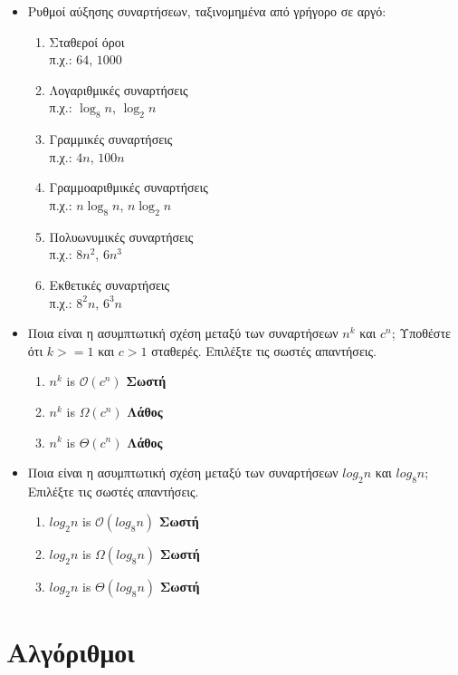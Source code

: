 \documentclass[a4paper,12pt]{article}
\begin{document}
\begin{itemize}
    \item Ρυθμοί αύξησης συναρτήσεων, ταξινομημένα από γρήγορο σε αργό:
    \begin{enumerate}
        \item Σταθεροί όροι \\
        π.χ.:    $64$, $1000$
        \item Λογαριθμικές συναρτήσεις \\
        π.χ.:    $\log_8n$, $\log_2n$
        \item Γραμμικές συναρτήσεις \\
        π.χ.:    $4n$, $100n$
        \item Γραμμοαριθμικές συναρτήσεις \\
        π.χ.:    $n\log_8n$, $n\log_2n$
        \item Πολυωνυμικές συναρτήσεις \\
        π.χ.:    $8n^2$, $6n^3$
        \item Εκθετικές συναρτήσεις \\
        π.χ.:    $8^2n$, $6^3n$
    \end{enumerate}
    \item Ποια είναι η ασυμπτωτική σχέση μεταξύ των συναρτήσεων $n^k$ και $c^n$; Υποθέστε
    ότι $k >= 1$ και $c > 1$ σταθερές. Επιλέξτε τις σωστές απαντήσεις.
    \begin{enumerate}
        \item $n^k$ is $\mathcal{O}(c^n)$ \textbf{Σωστή}
        \item $n^k$ is $\Omega(c^n)$ \textbf{Λάθος}
        \item $n^k$ is $\Theta(c^n)$ \textbf{Λάθος}
    \end{enumerate}        
    \item Ποια είναι η ασυμπτωτική σχέση μεταξύ των συναρτήσεων $log_2n$ και $log_8n$; 
    Επιλέξτε τις σωστές απαντήσεις.
    \begin{enumerate}
        \item $log_2n$ is $\mathcal{O}(log_8n)$ \textbf{Σωστή}
        \item $log_2n$ is $\Omega(log_8n)$ \textbf{Σωστή}
        \item $log_2n$ is $\Theta(log_8n)$ \textbf{Σωστή}
    \end{enumerate}            
\end{itemize}

\newpage
\section{Αλγόριθμοι}
\end{document}
